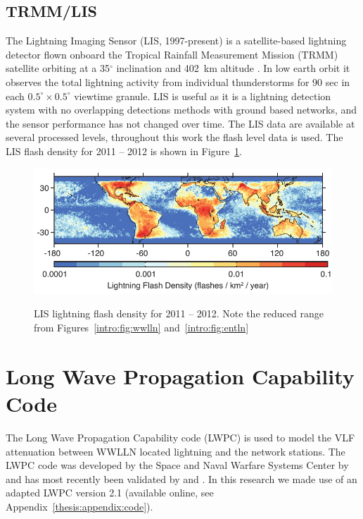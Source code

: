 \subsection{TRMM/LIS}

The Lightning Imaging Sensor (LIS, 1997-present) is a satellite-based lightning detector flown onboard the Tropical Rainfall Measurement Mission (TRMM) satellite orbiting at a 35$^\circ$ inclination and 402~km altitude \citep{Christian1999}.
In low earth orbit it observes the total lightning activity from individual thunderstorms for 90 sec in each $0.5^\circ \times 0.5^\circ$ viewtime granule.
LIS is useful as it is a lightning detection system with no overlapping detections methods with ground based networks, and the sensor performance has not changed over time.
The LIS data are available at several processed levels, throughout this work the flash level data is used.
The LIS flash density for 2011 -- 2012 is shown in Figure~\ref{intro:fig:lis}.

\begin{figure}[ht!]
	\centering
	\includegraphics[scale=1]{Introduction/Figures/lis_density.pdf}\\
	\caption{LIS lightning flash density for 2011 -- 2012.
		     Note the reduced range from Figures~\ref{intro:fig:wwlln} and~\ref{intro:fig:entln}}
	\label{intro:fig:lis}
\end{figure}

\section{Long Wave Propagation Capability Code}
\label{intro:sec:lwpc}

The Long Wave Propagation Capability code (LWPC) is used to model the VLF attenuation between WWLLN located lightning and the network stations.
The LWPC code was developed by the Space and Naval Warfare Systems Center by \citet{Ferguson1998} and has most recently been validated by \citet{McRae2000d} and \citet{Thomson2011}.
In this research we made use of an adapted LWPC version 2.1 (available online, see Appendix~\ref{thesis:appendix:code}).

